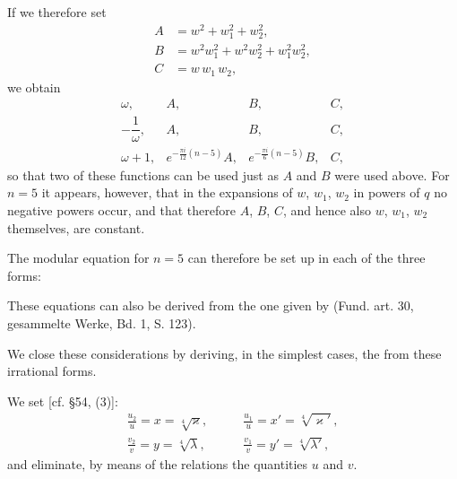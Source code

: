 If we therefore set
\[
\begin{aligned}
A &= w^2 + w_1^2 + w_2^2,\\
B &= w^2w_1^2 + w^2w_2^2 + w_1^2w_2^2,\\
C &= w\,w_1\,w_2,
\end{aligned}
\]
we obtain
\[
\begin{array}{cccc}
\omega, & A, & B, & C, \\
-\dfrac{1}{\omega}, & A, & B, & C, \\
\omega+1, & e^{-\frac{\pi i}{12}(n-5)}A, & e^{-\frac{\pi i}{6}(n-5)}B, & C,
\end{array}
\]
so that two of these functions can be used just as $A$ and $B$ were used
above. For $n=5$ it appears, however, that in the expansions of $w$,
$w_1$, $w_2$ in powers of $q$ no negative powers occur, and that therefore
$A$, $B$, $C$, and hence also $w$, $w_1$, $w_2$ themselves, are constant.

The modular equation for $n=5$ can therefore be set up in each of the
three forms:

These equations can also be derived from the one given by 
(Fund. art. 30, gesammelte Werke, Bd. 1, S. 123).

We close these considerations by deriving, in the simplest cases, the
 from these irrational forms.

We set [cf. \S 54, (3)]:
\[
\begin{aligned}
\frac{u_2}{u} = x = \sqrt[4]{\varkappa}, &\qquad \frac{u_1}{u} = x' = \sqrt[4]{\varkappa'},\\[6pt]
\frac{v_2}{v} = y = \sqrt[4]{\lambda}, &\qquad \frac{v_1}{v} = y' = \sqrt[4]{\lambda'},
\end{aligned}
\]
and eliminate, by means of the relations
the quantities $u$ and $v$.
